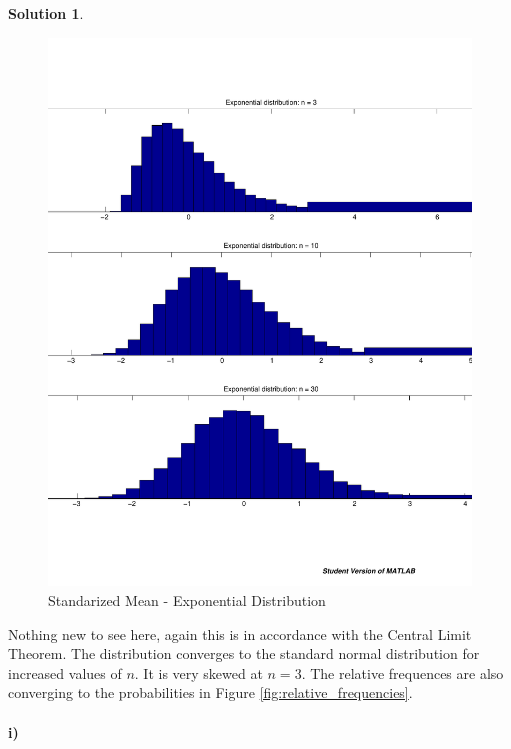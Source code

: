 \documentclass[a4paper, fleqn]{amsart}
\theoremstyle{definition}
\newtheorem{sltn}{Solution}
\begin{document}
\begin{sltn}
\begin{figure}[p]
  \centering
  \includegraphics[scale=0.4]{exponential_mean}
  \caption{Standarized Mean - Exponential Distribution}
  \label{fig:exponential_mean}
\end{figure}

Nothing new to see here, again this is in accordance with the Central Limit Theorem.
The distribution converges to the standard normal distribution for increased values of $n$.
It is very skewed at $n = 3$. The relative frequences are also converging to the probabilities
in Figure \ref{fig:relative_frequencies}.

\paragraph{i)}


\end{sltn}
\end{document}
